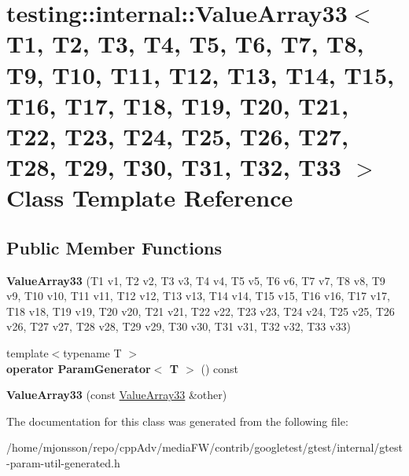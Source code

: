 \hypertarget{classtesting_1_1internal_1_1ValueArray33}{}\section{testing\+:\+:internal\+:\+:Value\+Array33$<$ T1, T2, T3, T4, T5, T6, T7, T8, T9, T10, T11, T12, T13, T14, T15, T16, T17, T18, T19, T20, T21, T22, T23, T24, T25, T26, T27, T28, T29, T30, T31, T32, T33 $>$ Class Template Reference}
\label{classtesting_1_1internal_1_1ValueArray33}
\subsection*{Public Member Functions}
\begin{DoxyCompactItemize}
\item 
\mbox{\label{classtesting_1_1internal_1_1ValueArray33_a651446935b07a1e9186f053da55d9a43}} 
{\bfseries Value\+Array33} (T1 v1, T2 v2, T3 v3, T4 v4, T5 v5, T6 v6, T7 v7, T8 v8, T9 v9, T10 v10, T11 v11, T12 v12, T13 v13, T14 v14, T15 v15, T16 v16, T17 v17, T18 v18, T19 v19, T20 v20, T21 v21, T22 v22, T23 v23, T24 v24, T25 v25, T26 v26, T27 v27, T28 v28, T29 v29, T30 v30, T31 v31, T32 v32, T33 v33)
\item 
\mbox{\label{classtesting_1_1internal_1_1ValueArray33_adba3f5fe897de2c06eb6b5aa9965c7c0}} 
{\footnotesize template$<$typename T $>$ }\\{\bfseries operator Param\+Generator$<$ T $>$} () const
\item 
\mbox{\label{classtesting_1_1internal_1_1ValueArray33_a27fe430ae99bcd191f6a972ed239a5b0}} 
{\bfseries Value\+Array33} (const \hyperlink{classtesting_1_1internal_1_1ValueArray33}{Value\+Array33} \&other)
\end{DoxyCompactItemize}


The documentation for this class was generated from the following file\+:\begin{DoxyCompactItemize}
\item 
/home/mjonsson/repo/cpp\+Adv/media\+F\+W/contrib/googletest/gtest/internal/gtest-\/param-\/util-\/generated.\+h\end{DoxyCompactItemize}

